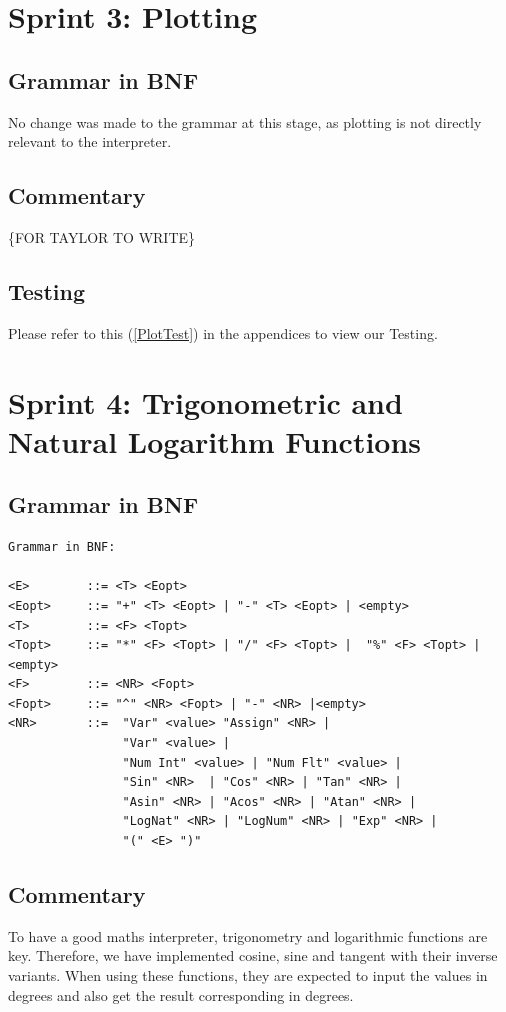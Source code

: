 \documentclass[a4paper, oneside, 11pt]{report}
\begin{document}
\section{Sprint 3: Plotting}
\subsection{Grammar in BNF}
No change was made to the grammar at this stage, as plotting is not directly relevant to the interpreter.

\subsection{Commentary}
\{FOR TAYLOR TO WRITE\}

\subsection{Testing}
Please refer to this (\ref{PlotTest}) in the appendices to view our Testing. \\

\clearpage
\section{Sprint 4: Trigonometric and Natural Logarithm Functions}
\subsection{Grammar in BNF}
\begin{verbatim}
Grammar in BNF:

<E>        ::= <T> <Eopt>
<Eopt>     ::= "+" <T> <Eopt> | "-" <T> <Eopt> | <empty>
<T>        ::= <F> <Topt>
<Topt>     ::= "*" <F> <Topt> | "/" <F> <Topt> |  "%" <F> <Topt> |<empty>
<F>        ::= <NR> <Fopt>
<Fopt>     ::= "^" <NR> <Fopt> | "-" <NR> |<empty> 
<NR>       ::=  "Var" <value> "Assign" <NR> |
                "Var" <value> |
                "Num Int" <value> | "Num Flt" <value> | 
                "Sin" <NR>  | "Cos" <NR> | "Tan" <NR> |
                "Asin" <NR> | "Acos" <NR> | "Atan" <NR> |
                "LogNat" <NR> | "LogNum" <NR> | "Exp" <NR> |
                "(" <E> ")"
\end{verbatim}
\subsection{Commentary}
To have a good maths interpreter, trigonometry and logarithmic functions are key. Therefore, we have implemented cosine, sine and tangent with their inverse variants. When using these functions, they are expected to input the values in degrees and also get the result corresponding in degrees. 
\end{document}
